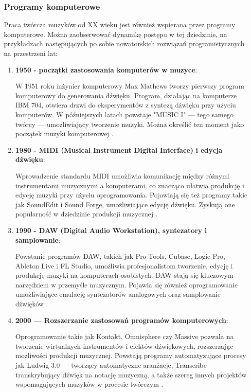 \subsubsection{Programy komputerowe}
Praca twórcza muzyków od XX wieku jest również wspierana przez programy komputerowe. Można zaobserwować dynamikę postępu
w tej dziedzinie, na przykładzach następujących po sobie nowatorskich rozwiązań programistycznych na przestrzeni lat:
\begin{enumerate}
	\item \textbf{1950 - początki zastosowania komputerów w muzyce}:

	      W 1951 roku inżynier komputerowy Max Mathews tworzy pierwszy program komputerowy do generowania dźwięku.
	      Program, działając na komputerze IBM 704, otwiera drzwi do eksperymentów z syntezą dźwięku przy użyciu komputerów.
	      W późniejszych latach powstaje "MUSIC I" — tego samego twórcy — umożliwiający tworzenie muzyki.
	      Można określić ten moment jako początek muzyki komputerowej \cite{50}.
	\item \textbf{1980 - MIDI (Musical Instrument Digital Interface) i edycja dźwięku}:

	      Wprowadzenie standardu MIDI umożliwia komunikację między różnymi instrumentami muzycznymi a komputerami,
	      co znacząco ułatwia produkcję i edycję muzyki przy użyciu oprogramowania.
	      Pojawiają się też programy takie jak SoundEdit i Sound Forge, umożliwiające edycję dźwięku.
	      Zyskują one popularność w dziedzinie produkcji muzycznej \cite{90}.
	\item \textbf{1990 - DAW (Digital Audio Workstation), syntezatory i samplowanie}:

	      Powstanie programów DAW, takich jak Pro Tools, Cubase, Logic Pro, Ableton Live i FL Studio,
	      umożliwia profesjonalistom tworzenie, edycję i produkcję muzyki na komputerach osobistych.
	      DAW stają się kluczowym narzędziem w przemyśle muzycznym.
	      Pojawia się również oprogramowanie umożliwiające emulację syntezatorów analogowych oraz samplowanie dźwięków \cite{90}.
	\item \textbf{2000 — Rozszerzanie zastosowań programów komputerowych}:

	      Oprogramowanie takie jak Kontakt, Omnisphere czy Massive pozwala na tworzenie wirtualnych instrumentów i efektów
	      dźwiękowych, rozszerzając możliwości produkcji muzycznej.
	      Powstają programy automatyzujące procesy jak Ludwig 3.0 — tworzący automatyczne aranżacje, Transcribe — transkrybujący
	      dźwięk na notację muzyczną, a także szereg innych projektów wspomagających muzyków w procesie twórczym \cite{00}.
\end{enumerate}

